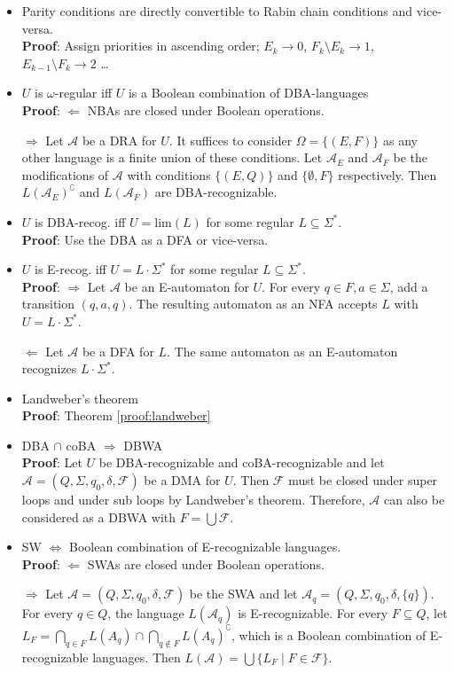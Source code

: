 \documentclass{article}
\begin{document}
\begin{itemize}
	\item Parity conditions are directly convertible to Rabin chain conditions and vice-versa. \\
		\textbf{Proof}: Assign priorities in ascending order; $E_k \rightarrow 0$, $F_k \setminus E_k \rightarrow 1$, $E_{k-1} \setminus F_k \rightarrow 2$ \dots
	\item $U$ is $\omega$-regular iff $U$ is a Boolean combination of DBA-languages \\
		\textbf{Proof}: $\bm{\Leftarrow}$ NBAs are closed under Boolean operations.
		
		$\bm{\Rightarrow}$ Let $\mathcal{A}$ be a DRA for $U$. It suffices to consider $\Omega = \{(E, F)\}$ as any other language is a finite union of these conditions. Let $\mathcal{A}_E$ and $\mathcal{A}_F$ be the modifications of $\mathcal{A}$ with conditions $\{(E, Q)\}$ and $\{\emptyset, F\}$ respectively. Then $L(\mathcal{A}_E)^\complement$ and $L(\mathcal{A}_F)$ are DBA-recognizable.
	\item $U$ is DBA-recog. iff $U = \text{lim}(L)$ for some regular $L \subseteq \Sigma^*$. \\
		\textbf{Proof}: Use the DBA as a DFA or vice-versa.
	\item $U$ is E-recog. iff $U = L \cdot \Sigma^*$ for some regular $L \subseteq \Sigma^*$. \\
		\textbf{Proof}: $\bm{\Rightarrow}$ Let $\mathcal{A}$ be an E-automaton for $U$. For every $q \in F, a \in \Sigma$, add a transition $(q, a, q)$. The resulting automaton as an NFA accepts $L$ with $U = L \cdot \Sigma^*$.
		
		$\bm{\Leftarrow}$ Let $\mathcal{A}$ be a DFA for $L$. The same automaton as an E-automaton recognizes $L \cdot \Sigma^*$.
	\item Landweber's theorem \\
		\textbf{Proof}: Theorem \ref{proof:landweber}
	\item DBA $\cap$ coBA $\Rightarrow$ DBWA \\
		\textbf{Proof}: Let $U$ be DBA-recognizable and coBA-recognizable and let $\mathcal{A} = (Q, \Sigma, q_0, \delta, \mathcal{F})$ be a DMA for $U$. Then $\mathcal{F}$ must be closed under super loops and under sub loops by Landweber's theorem. Therefore, $\mathcal{A}$ can also be considered as a DBWA with $F = \bigcup \mathcal{F}$.
	\item SW $\Leftrightarrow$ Boolean combination of E-recognizable languages. \\
		\textbf{Proof}: $\bm{\Leftarrow}$ SWAs are closed under Boolean operations.
		
		$\bm{\Rightarrow}$ Let $\mathcal{A} = (Q, \Sigma, q_0, \delta, \mathcal{F})$ be the SWA and let $\mathcal{A}_q = (Q, \Sigma, q_0, \delta, \{q\})$. For every $q \in Q$, the language $L(\mathcal{A}_q)$ is E-recognizable. For every $F \subseteq Q$, let $L_F = \bigcap\limits_{q \in F} L(A_q) \cap \bigcap\limits_{q \notin F} L(A_q)^\complement$, which is a Boolean combination of E-recognizable languages. Then $L(\mathcal{A}) = \bigcup \{ L_F \mid F \in \mathcal{F} \}$.
\end{itemize}
\end{document}
